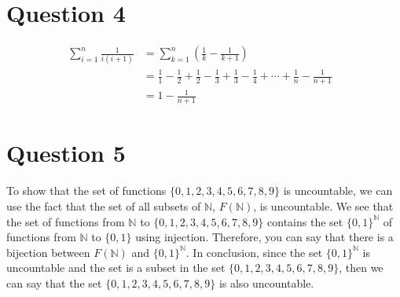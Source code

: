 \documentclass[letterpaper, 12pt]{article}
\begin{document}
\section*{Question 4}
\begin{align*}
    \sum_{i=1}^{n} \frac{1}{i(i+1)} & = \sum_{k=1}^{n} \left(\frac{1}{k}-\frac{1}{k+1}\right)&\\
    & = \frac{1}{1} - \frac{1}{2} + \frac{1}{2} - \frac{1}{3} + \frac{1}{3} - \frac{1}{4} + \cdots + \frac{1}{n} - \frac{1}{n+1}&\\
    & = 1 - \frac{1}{n+1}
\end{align*}

\section*{Question 5}
To show that the set of functions $\{ 0, 1, 2, 3, 4, 5, 6, 7, 8, 9 \}$ is uncountable, we can use the fact that the set of all subsets of $\mathbb{N}$, $F(\mathbb{N})$, is uncountable. We see that the set of functions from $\mathbb{N}$ to $\{ 0, 1, 2, 3, 4, 5, 6, 7, 8, 9 \}$ contains the set $\{0, 1\}^{\mathbb{N}}$ of functions from $\mathbb{N}$ to $\{0,1\}$ using injection. Therefore, you can say that there is a bijection between $F(\mathbb{N})$ and $\{0, 1\}^{\mathbb{N}}$. In conclusion, since the set $\{0,1\}^{\mathbb{N}}$ is uncountable and the set is a subset in the set $\{ 0, 1, 2, 3, 4, 5, 6, 7, 8, 9 \}$, then we can say that the set $\{ 0, 1, 2, 3, 4, 5, 6, 7, 8, 9 \}$ is also uncountable.
\end{document}

